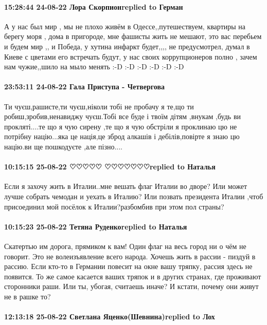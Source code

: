 \paragraph{15:28:44 24-08-22 Лора Скорпионreplied to Герман}

А у нас был мир , мы не плохо живём в Одессе,,путешествуем, квартиры на берегу
моря , дома в пригороде, мне фашисты жить не мешают, это вас перебьем и будем
мир ,, и Победа, у хутина инфаркт будет,,,, не предусмотрел, думал в Киеве с
цветами его встречать будут, у нас своих коррупционеров полно , зачем нам
чужие,,шило на мыло менять :-D :-D :-D :-D :-D :-D

\paragraph{23:53:11 24-08-22 Гала Приступа - Четвергова}

Ти чуєш,рашисте,ти чуєш,ніколи тобі не пробачу я те,що ти
робиш,зробив,ненавиджу чуєш.Тобі все буде і твоїм дітям ,внукам ,будь ви
прокляті....те що я чую сирену ,те що я чую обстріли я проклинаю цю не потрібну
націю...яка це нація,це зброд алкашів і дебілів,повірте я знаю цю націю.ви ще
пошкодуєте ,але пізно....

\paragraph{10:15:15 25-08-22 ♡♡♡♡♡ ♡♡♡♡♡♡♡replied to Наталья}

Если я захочу жить в Италии..мне вешать флаг Италии во дворе? Или может лучше
собрать чемодан и уехать в Италию? Или позвать президента Италии ,чтоб
присоединил мой посёлок к Италии?разбомбив при этом пол страны?

\paragraph{10:15:23 25-08-22 Тетяна Руденкоreplied to Наталья}

Скатертью им дорога, прямиком к вам! Один флаг на весь город ни о чём не
говорит. Это не волеизъявление всего народа. Хочешь жить в рассии - пиздуй в
рассию. Если кто-то в Германии повесит на окне вашу тряпку, рассия здесь не
появится. То же самое касается ваших тряпок и в других странах, где проживают
сторонники раши. Или ты, убогая, считаешь иначе?
И кстати, почему они живут не в рашке то?🤣

\paragraph{12:13:18 25-08-22 Светлана Яценко(Шевнина)replied to Лох}

